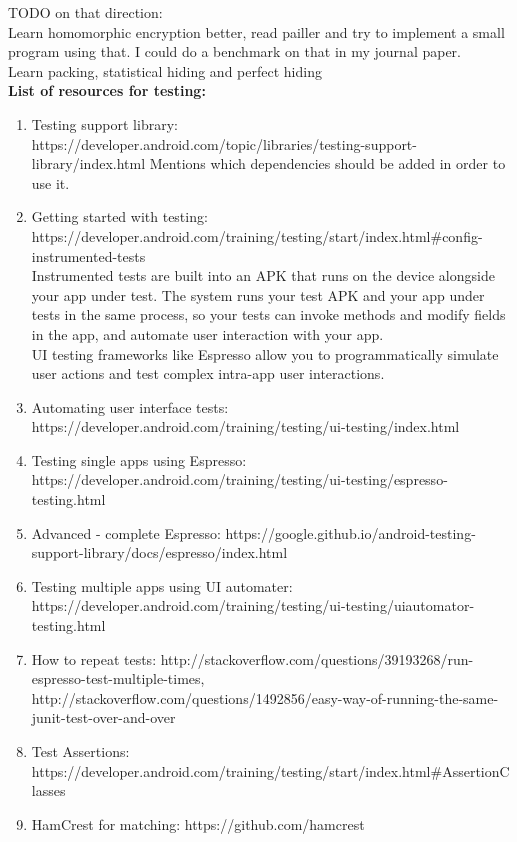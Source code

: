 \documentclass[11pt]{article}
\begin{document}
TODO on that direction:\\
Learn homomorphic encryption better, read pailler and try to implement a small program using that. I could do a benchmark on that in my journal 
paper.\\
Learn packing, statistical hiding and perfect hiding\\

\textbf{List of resources for testing:}
\begin{enumerate}
 \item Testing support library: https://developer.android.com/topic/libraries/testing-support-library/index.html
 Mentions which dependencies should be added in order to use it.
 
 \item Getting started with testing: https://developer.android.com/training/testing/start/index.html\#config-instrumented-tests\\
 
 Instrumented tests are built into an APK that runs on the device alongside your app under test. The system runs your test APK and your app under 
 tests in the same process, so your tests can invoke methods and modify fields in the app, and automate user interaction with your app.\\
 
 UI testing frameworks like Espresso allow you to programmatically simulate user actions and test complex intra-app user interactions.
 
 \item Automating user interface tests: https://developer.android.com/training/testing/ui-testing/index.html
 \item Testing single apps using Espresso: https://developer.android.com/training/testing/ui-testing/espresso-testing.html
 \item Advanced - complete Espresso: https://google.github.io/android-testing-support-library/docs/espresso/index.html
 \item Testing multiple apps using UI automater: https://developer.android.com/training/testing/ui-testing/uiautomator-testing.html
 \item How to repeat tests: http://stackoverflow.com/questions/39193268/run-espresso-test-multiple-times, 
http://stackoverflow.com/questions/1492856/easy-way-of-running-the-same-junit-test-over-and-over
 \item Test Assertions: https://developer.android.com/training/testing/start/index.html\#AssertionClasses
 \item HamCrest for matching: https://github.com/hamcrest
\end{enumerate}
\end{document}
